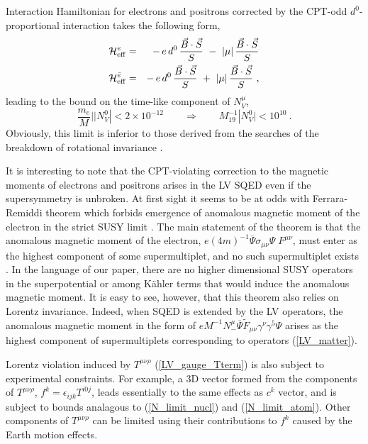 \documentclass[12pt]{revtex4}
\begin{document}
Interaction Hamiltonian for electrons and positrons corrected by the 
CPT-odd $d^0$-proportional interaction takes the following form,
\begin{eqnarray*}
 \mathcal{H}_{\rm eff}^{e} & = & 
-\, e\, d^0\, \frac{\vec{B}\cdot\vec{S}}{S}
~-~ 
|\mu|\, \frac{\vec{B}\cdot\vec{S}}{S}
\\
 \mathcal{H}_{\rm eff}^{\bar{e}} & = & 
-\, e\, d^0\, \frac{\vec{B}\cdot\vec{S}}{S}
~+~ 
|\mu|\, \frac{\vec{B}\cdot\vec{S}}{S}~,
\end{eqnarray*}
leading to the bound on the time-like component of $N_V^\mu$, 
\begin{equation}
 \frac{m_e}{M}| |N_V^0| < 2\times 10^{-12} \qquad \Rightarrow \qquad M_{19}^{-1}|N_V^0|< 10^{10} 
~.
\end{equation}
Obviously, this limit is inferior to those derived from the searches of
the breakdown of rotational invariance \cite{clock1,clock2}.

It is interesting to note that the CPT-violating correction to
the magnetic moments of electrons and positrons arises in the LV SQED
even if the supersymmetry is unbroken. At first sight it seems to 
be at odds with Ferrara-Remiddi theorem which
forbids emergence of anomalous magnetic moment of the
electron in the strict SUSY limit \cite{Ferrara:1974wb}.
The main statement of the theorem is that 
the anomalous magnetic moment of the electron, 
$e(4m)^{-1} \overline{\Psi} \sigma_{\mu\nu} \Psi \; F^{\mu\nu}$, must enter
as the highest component of some supermultiplet, and
no such supermultiplet exists \cite{Ferrara:1974wb}.
In the language of our paper, there are no higher dimensional 
SUSY operators in the superpotential or among K\"ahler terms that 
would induce the anomalous magnetic moment. 
It is easy to see, however, that this theorem also relies on Lorentz invariance.
Indeed, when SQED is extended by the LV operators, the anomalous magnetic moment in the 
form of $eM^{-1}N_-^\mu
	  \overline{\Psi} \widetilde{F}_{\mu\nu}
                    \gamma^\nu \gamma^5 \Psi$ arises as the highest component of 
supermultiplets corresponding to operators (\ref{LV_matter}).

Lorentz violation induced by $ T^{\mu\nu\rho} $ (\ref{LV_gauge_Tterm})
is also subject to experimental constraints. For example, 
a 3D vector formed from the components of $T^{\mu\nu\rho} $,
$ f^k=\epsilon_{ijk} T^{i0j}$, leads essentially to the same effects as 
$c^k$ vector, and is subject to bounds analagous to (\ref{N_limit_nucl}) and 
(\ref{N_limit_atom}). Other components of $ T^{\mu\nu\rho} $ can be limited using  
their contributions to $f^k$ caused by the Earth motion effects. 
\end{document}
